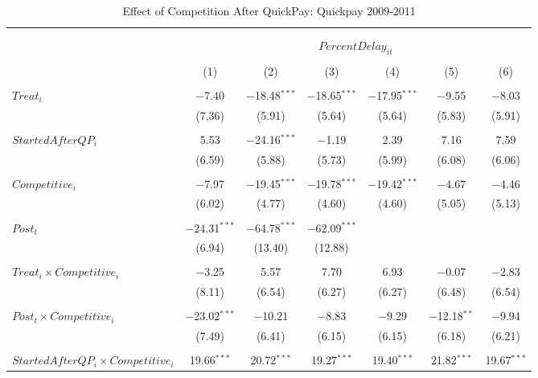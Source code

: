 \documentclass[
]{article}
\begin{document}
\begin{table}[H] \centering 
  \caption{Effect of Competition After QuickPay: Quickpay 2009-2011} 
  \label{} 
\small 
\begin{tabular}{@{\extracolsep{-3pt}}lcccccc} 
\\[-1.8ex]\hline 
\hline \\[-1.8ex] 
\\[-1.8ex] & \multicolumn{6}{c}{$PercentDelay_{it}$  } \\ 
\\[-1.8ex] & (1) & (2) & (3) & (4) & (5) & (6)\\ 
\hline \\[-1.8ex] 
 $Treat_i$ & $-$7.40 & $-$18.48$^{***}$ & $-$18.65$^{***}$ & $-$17.95$^{***}$ & $-$9.55 & $-$8.03 \\ 
  & (7.36) & (5.91) & (5.64) & (5.64) & (5.83) & (5.91) \\ 
  & & & & & & \\ 
 $StartedAfterQP_i$ & 5.53 & $-$24.16$^{***}$ & $-$1.19 & 2.39 & 7.16 & 7.59 \\ 
  & (6.59) & (5.88) & (5.73) & (5.99) & (6.08) & (6.06) \\ 
  & & & & & & \\ 
 $Competitive_i$ & $-$7.97 & $-$19.45$^{***}$ & $-$19.78$^{***}$ & $-$19.42$^{***}$ & $-$4.67 & $-$4.46 \\ 
  & (6.02) & (4.77) & (4.60) & (4.60) & (5.05) & (5.13) \\ 
  & & & & & & \\ 
 $Post_t$ & $-$24.31$^{***}$ & $-$64.78$^{***}$ & $-$62.09$^{***}$ &  &  &  \\ 
  & (6.94) & (13.40) & (12.88) &  &  &  \\ 
  & & & & & & \\ 
 $Treat_i \times Competitive_i$ & $-$3.25 & 5.57 & 7.70 & 6.93 & $-$0.07 & $-$2.83 \\ 
  & (8.11) & (6.54) & (6.27) & (6.27) & (6.48) & (6.54) \\ 
  & & & & & & \\ 
 $Post_t \times Competitive_i$ & $-$23.02$^{***}$ & $-$10.21 & $-$8.83 & $-$9.29 & $-$12.18$^{**}$ & $-$9.94 \\ 
  & (7.49) & (6.41) & (6.15) & (6.15) & (6.18) & (6.21) \\ 
  & & & & & & \\ 
 $StartedAfterQP_i \times Competitive_i$ & 19.66$^{***}$ & 20.72$^{***}$ & 19.27$^{***}$ & 19.40$^{***}$ & 21.82$^{***}$ & 19.67$^{***}$ \\ 

\end{tabular}
\end{table}
\end{document}
